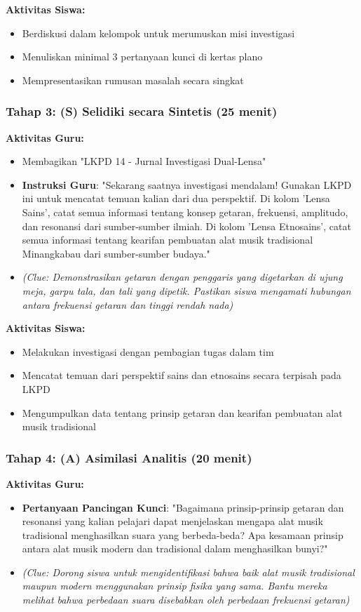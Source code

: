 \documentclass[12pt,a4paper]{article}
\begin{document}
\textbf{Aktivitas Siswa:}
\begin{itemize}
\item Berdiskusi dalam kelompok untuk merumuskan misi investigasi
\item Menuliskan minimal 3 pertanyaan kunci di kertas plano
\item Mempresentasikan rumusan masalah secara singkat
\end{itemize}

\subsubsection{Tahap 3: (S) Selidiki secara Sintetis (25 menit)}

\textbf{Aktivitas Guru:}
\begin{itemize}
\item Membagikan "LKPD 14 - Jurnal Investigasi Dual-Lensa"
\item \textbf{Instruksi Guru}: "Sekarang saatnya investigasi mendalam! Gunakan LKPD ini untuk mencatat temuan kalian dari dua perspektif. Di kolom 'Lensa Sains', catat semua informasi tentang konsep getaran, frekuensi, amplitudo, dan resonansi dari sumber-sumber ilmiah. Di kolom 'Lensa Etnosains', catat semua informasi tentang kearifan pembuatan alat musik tradisional Minangkabau dari sumber-sumber budaya."
\item \textit{(Clue: Demonstrasikan getaran dengan penggaris yang digetarkan di ujung meja, garpu tala, dan tali yang dipetik. Pastikan siswa mengamati hubungan antara frekuensi getaran dan tinggi rendah nada)}
\end{itemize}

\textbf{Aktivitas Siswa:}
\begin{itemize}
\item Melakukan investigasi dengan pembagian tugas dalam tim
\item Mencatat temuan dari perspektif sains dan etnosains secara terpisah pada LKPD
\item Mengumpulkan data tentang prinsip getaran dan kearifan pembuatan alat musik tradisional
\end{itemize}

\subsubsection{Tahap 4: (A) Asimilasi Analitis (20 menit)}

\textbf{Aktivitas Guru:}
\begin{itemize}
\item \textbf{Pertanyaan Pancingan Kunci}: "Bagaimana prinsip-prinsip getaran dan resonansi yang kalian pelajari dapat menjelaskan mengapa alat musik tradisional menghasilkan suara yang berbeda-beda? Apa kesamaan prinsip antara alat musik modern dan tradisional dalam menghasilkan bunyi?"
\item \textit{(Clue: Dorong siswa untuk mengidentifikasi bahwa baik alat musik tradisional maupun modern menggunakan prinsip fisika yang sama. Bantu mereka melihat bahwa perbedaan suara disebabkan oleh perbedaan frekuensi getaran)}
\end{itemize}
\end{document}

